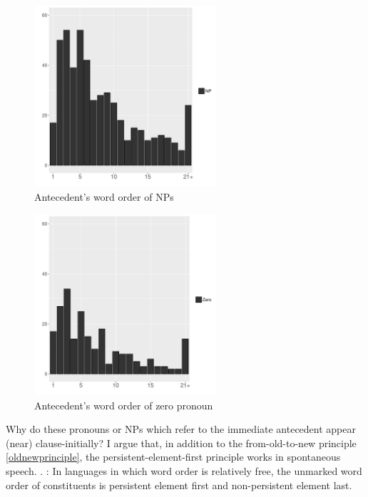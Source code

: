 \begin{figure}
	\begin{center}
	\includegraphics[width=0.6\textwidth]{figure/ExpTypePrevWO.pdf}
	\caption{Antecedent's word order of NPs}
	\label{ExpTypePrevWOF}
	\end{center}
\end{figure}
\begin{figure}
	\begin{center}
	\includegraphics[width=0.6\textwidth]{figure/ExpTypePrevWOZero.pdf}
	\caption{Antecedent's word order of zero pronoun}
	\label{ExpTypePrevWOZeroF}
	\end{center}
\end{figure}

Why do these pronouns or NPs which refer to the immediate antecedent appear (near) clause-initially?
I argue that, in addition to the from-old-to-new principle \ref{oldnewprinciple},
the persistent-element-first principle works in spontaneous speech.
%
\ex. \label{PerFirstPrinciple}:
 In languages in which word order is relatively free,
 the unmarked word order of constituents is persistent element first and non-persistent element last.

